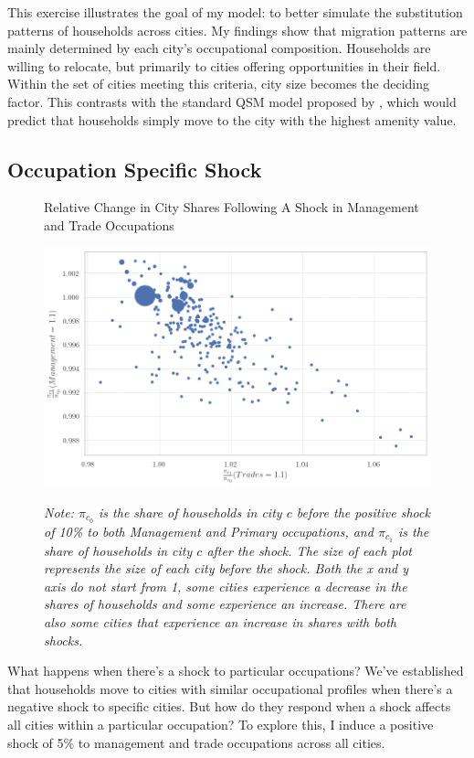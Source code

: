 \documentclass[10pt]{article}
\begin{document}
This exercise illustrates the goal of my model: to better simulate the substitution patterns of households across cities. My findings show that migration patterns are mainly determined by each city's occupational composition. Households are willing to relocate, but primarily to cities offering opportunities in their field. Within the set of cities meeting this criteria, city size becomes the deciding factor. This contrasts with the standard QSM model proposed by \cite{redding}, which would predict that households simply move to the city with the highest amenity value.

\subsection{Occupation Specific Shock}

\begin{figure}[!htb]
    \centering
    \caption{Relative Change in City Shares Following A Shock in Management and Trade Occupations}
    \includegraphics[width=\textwidth]{../../estimations/graphs/occ_shock_t.png}
    \label{man_change_graph}
    \caption*{\small\textit{Note: $\pi_{c_0}$ is the share of households in city $c$ before the positive shock of 10\% to both Management and Primary occupations, and $\pi_{c_1}$ is the share of households in city $c$ after the shock. The size of each plot represents the size of each city before the shock. Both the x and y axis do not start from 1, some cities experience a decrease in the shares of households and some experience an increase. There are also some cities that experience an increase in shares with both shocks.}}
\end{figure}

What happens when there's a shock to particular occupations? We've established that households move to cities with similar occupational profiles when there's a negative shock to specific cities. But how do they respond when a shock affects all cities within a particular occupation? To explore this, I induce a positive shock of 5\% to management and trade occupations across all cities.
\end{document}
